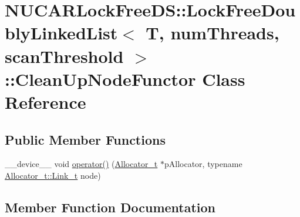 \hypertarget{class_n_u_c_a_r_lock_free_d_s_1_1_lock_free_doubly_linked_list_1_1_clean_up_node_functor}{}\section{N\+U\+C\+A\+R\+Lock\+Free\+DS\+:\+:Lock\+Free\+Doubly\+Linked\+List$<$ T, num\+Threads, scan\+Threshold $>$\+:\+:Clean\+Up\+Node\+Functor Class Reference}
\label{class_n_u_c_a_r_lock_free_d_s_1_1_lock_free_doubly_linked_list_1_1_clean_up_node_functor}
\subsection*{Public Member Functions}
\begin{DoxyCompactItemize}
\item 
\+\_\+\+\_\+device\+\_\+\+\_\+ void \mbox{\hyperlink{class_n_u_c_a_r_lock_free_d_s_1_1_lock_free_doubly_linked_list_1_1_clean_up_node_functor_a4381ff97073e9b5a09607f0e9f5ce77d}{operator()}} (\mbox{\hyperlink{class_n_u_c_a_r_lock_free_d_s_1_1_lock_free_doubly_linked_list_af534991f4eb0641191f936a80c701e6c}{Allocator\+\_\+t}} $\ast$p\+Allocator, typename \mbox{\hyperlink{class_n_u_c_a_r_lock_free_d_s_1_1_allocator_a5508d82b795e6c1977bebb67b5e5b686}{Allocator\+\_\+t\+::\+Link\+\_\+t}} node)
\end{DoxyCompactItemize}


\subsection{Member Function Documentation}
\mbox{\label{class_n_u_c_a_r_lock_free_d_s_1_1_lock_free_doubly_linked_list_1_1_clean_up_node_functor_a4381ff97073e9b5a09607f0e9f5ce77d}} 
